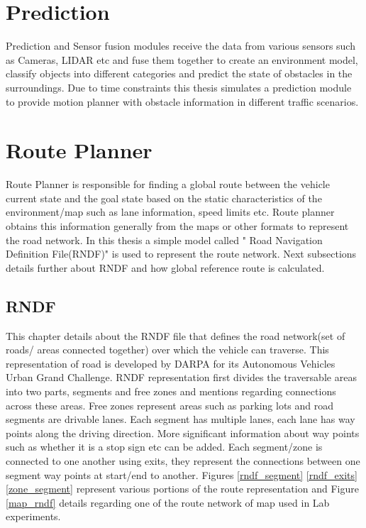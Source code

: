 \section{Prediction} \label{prediction}

Prediction and Sensor fusion modules receive the data from various sensors such as Cameras, LIDAR etc and fuse them together to create an environment model, classify objects into different categories and predict the state of obstacles in the surroundings. Due to time constraints this thesis simulates a prediction module to provide motion planner with obstacle information in different traffic scenarios.

\section{Route Planner} \label{route_planner}
Route Planner is responsible for finding a global route between the vehicle current state and the goal state based on the static characteristics of the environment/map such as lane information, speed limits etc. Route planner obtains this information generally from the maps or other formats to represent the road network. In this thesis a simple model called " Road Navigation Definition File(RNDF)"  \cite{rndf_darpa} \cite{rndf_fu} is used to represent the route network. Next subsections details further about RNDF and how global reference route is calculated.

\subsection{RNDF}

This chapter details about the RNDF file \cite{rndf_darpa} that defines the road network(set of roads/ areas connected together) over which the vehicle can traverse. This representation of road is developed by DARPA for its Autonomous Vehicles Urban Grand Challenge. RNDF representation first divides the traversable areas into two parts, segments and free zones and mentions regarding connections across these areas. Free zones represent areas such as parking lots and road segments are drivable lanes. Each segment has multiple lanes, each lane has way points along the driving direction. More significant information about way points such as whether it is a stop sign etc can be added. Each segment/zone is connected to one another using exits, they represent the connections between one segment way points at start/end to another. Figures \ref{rndf_segment} \ref{rndf_exits} \ref{zone_segment} \cite{rndf_darpa} represent various portions of the route representation and Figure \ref{map_rndf} details regarding one of the route network of map used in Lab experiments. 

